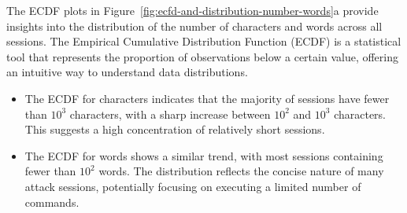        The ECDF plots in Figure~\ref{fig:ecfd-and-distribution-number-words}a provide insights into the distribution of the number of characters and words across all sessions. The Empirical Cumulative Distribution Function (ECDF) is a statistical tool that represents the proportion of observations below a certain value, offering an intuitive way to understand data distributions.
        
        \begin{itemize}
            \item The ECDF for characters indicates that the majority of sessions have fewer than $10^3$ characters, with a sharp increase between $10^2$ and $10^3$ characters. This suggests a high concentration of relatively short sessions.
            \item The ECDF for words shows a similar trend, with most sessions containing fewer than $10^2$ words. The distribution reflects the concise nature of many attack sessions, potentially focusing on executing a limited number of commands.
        \end{itemize}
        
